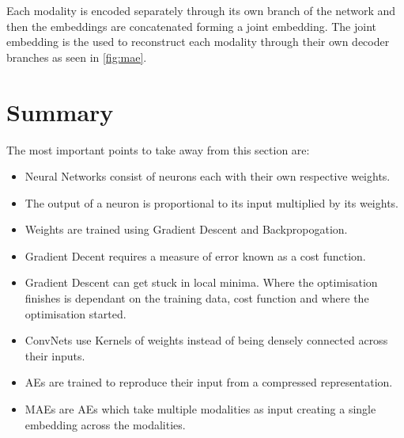 Each modality is encoded separately through its own branch of the network and then the embeddings are concatenated forming a joint embedding. The joint embedding is the used to reconstruct each modality through their own decoder branches as seen in \autoref{fig:mae}.

\section{Summary}

The most important points to take away from this section are:

\begin{itemize}
	\item Neural Networks consist of neurons each with their own respective weights.
	\item The output of a neuron is proportional to its input multiplied by its weights.
	\item Weights are trained using Gradient Descent and Backpropogation.
	\item Gradient Decent requires a measure of error known as a cost function.
	\item Gradient Descent can get stuck in local minima. Where the optimisation finishes is dependant on the training data, cost function and where the optimisation started.
	\item ConvNets use Kernels of weights instead of being densely connected across their inputs.
	\item AEs are trained to reproduce their input from a compressed representation.
	\item MAEs are AEs which take multiple modalities as input creating a single embedding across the modalities.
\end{itemize}
